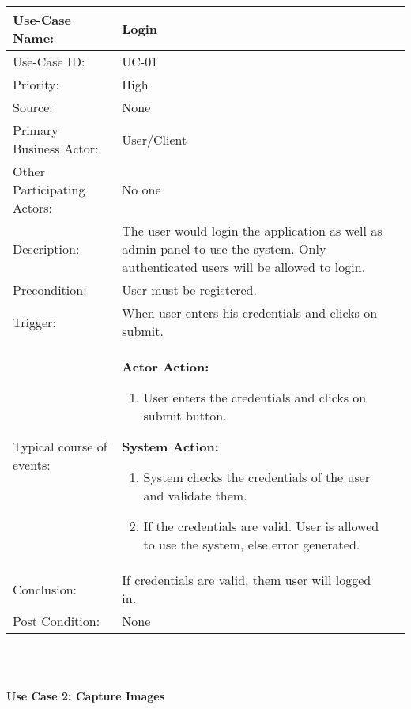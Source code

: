 \begin{tabular}{|l|p{}|p{}|}
	\hline
	Use-Case Name: & Login\\ \hline
	Use-Case ID:& UC-01 \\\hline
	Priority:& High\\ \hline
	Source:& None \\ \hline
	Primary Business Actor: & User/Client\\ \hline
	Other Participating Actors:&  No one\\ \hline
	Description:&  The user would login the application as well as admin panel to use the system. Only authenticated users will be allowed to login. \\ \hline
	Precondition:&  User must be registered. \\ \hline
	Trigger:&  When user enters his credentials and clicks on submit. \\ \hline 
	Typical course of events:&  \textbf{Actor Action:}
	\begin{enumerate}
		\item 	User enters the credentials and clicks on submit button.
	\end{enumerate}

	\vspace{2mm}
	
	\textbf{System Action: }
	\begin{enumerate}
		\item System checks the credentials of the user and validate them.
		\item 	If the credentials are valid. User is allowed to use the system, else error generated. 
	\end{enumerate}
	\\ \hline
	Conclusion:  & If credentials are valid, them user will logged in.\\ \hline
	Post Condition: & None \\ \hline
\end{tabular}\\
\\


\pagebreak

\textbf{Use Case 2: Capture Images}

